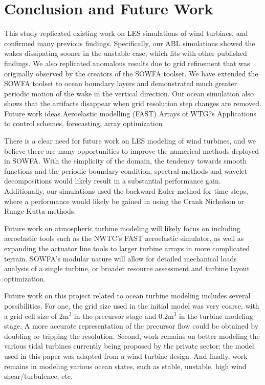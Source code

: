\section{Conclusion and Future Work}
This study replicated existing work on LES simulations of wind turbines, and confirmed many previous findings.  Specifically, our ABL simulations showed the wakes dissipating sooner in the unstable case, which fits with other published findings.  We also replicated anomalous results due to grid refinement that was originally observed by the creators of the SOWFA toolset.  We have extended the SOWFA toolset to ocean boundary layers and demonstrated much greater periodic motion of the wake in the vertical direction.  Our ocean simulation also shows that the artifacts disappear when grid resolution step changes are removed.
Future work ideas
Aeroelastic modelling (FAST)
Arrays of WTG?s
Applications to control schemes, forecasting, array optimization

There is a clear need for future work on LES modeling of wind turbines, and we believe there are many opportunities to improve the numerical methods deployed in SOWFA.  With the simplicity of the domain, the tendency towards smooth functions and the periodic boundary condition, spectral methods and wavelet decompositions would likely result in a substantial performance gain. Additionally, our simulations used the backward Euler method for time steps, where a performance would likely be gained in using the Crank Nicholson or Runge Kutta methods.

Future work on atmospheric turbine modeling will likely focus on including aeroelastic tools such as the NWTC's FAST aeroelastic simulator, as well as expanding the actuator line tools to larger turbine arrays in more complicated terrain.  SOWFA's modular nature will allow for detailed mechanical loads analysis of a single turbine, or broader resource assessment and turbine layout optimization.

Future work on this project related to ocean turbine modeling includes several possibilities. For one, the grid size used in the initial model was very coarse, with a grid cell size of 2m$^3$ in the precursor stage and 0.2m$^3$ in the turbine modeling stage. A more accurate representation of the precursor flow could be obtained by doubling or tripping the resolution. Second, work remains on better modeling the various tidal turbines currently being proposed by the private sector; the model used in this paper was adapted from a wind turbine design. And finally, work remains in modeling various ocean states, such as stable, unstable, high wind shear/turbulence, etc.



